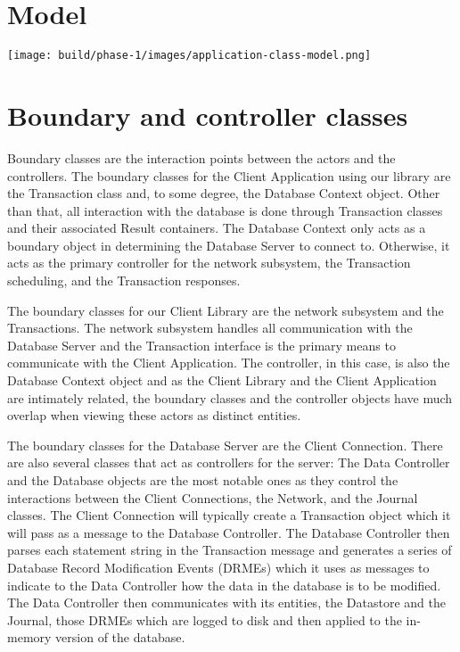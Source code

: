 \documentclass[a4paper]{report}
\begin{document}
\section{Model}

	\begin{center}
		\texttt{[image: build/phase-1/images/application-class-model.png]}
	\end{center}

	\pagebreak

\section{Boundary and controller classes}

	Boundary classes are the interaction points between the actors and the controllers. The boundary classes for the Client Application using our library are the Transaction class and, to some degree, the Database Context object. Other than that, all interaction with the database is done through Transaction classes and their associated Result containers. The Database Context only acts as a boundary object in determining the Database Server to connect to. Otherwise, it acts as the primary controller for the network subsystem, the Transaction scheduling, and the Transaction responses.

	The boundary classes for our Client Library are the network subsystem and the Transactions. The network subsystem handles all communication with the Database Server and the Transaction interface is the primary means to communicate with the Client Application. The controller, in this case, is also the Database Context object and as the Client Library and the Client Application are intimately related, the boundary classes and the controller objects have much overlap when viewing these actors as distinct entities.

	The boundary classes for the Database Server are the Client Connection. There are also several classes that act as controllers for the server: The Data Controller and the Database objects are the most notable ones as they control the interactions between the Client Connections, the Network, and the Journal classes. The Client Connection will typically create a Transaction object which it will pass as a message to the Database Controller. The Database Controller then parses each statement string in the Transaction message and generates a series of Database Record Modification Events (DRMEs) which it uses as messages to indicate to the Data Controller how the data in the database is to be modified. The Data Controller then communicates with its entities, the Datastore and the Journal, those DRMEs which are logged to disk and then applied to the in-memory version of the database.
\end{document}
